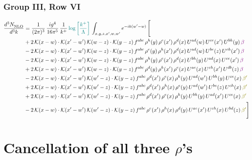 \documentclass[9pt]{article}
\numberwithin{equation}{section}
\begin{document}
\subsubsection{Group III, Row VI}
\begin{align}
     \frac{d^{3}N_{\rm NLO}^{\rm}}{d^{3}k}  & = \frac{1}{(2\pi)^{3}}\, \frac{ig^{4}}{16\pi^{5}}\, \frac{1}{k^{+}}\, {\color{teal}\log{\left[\frac{k^{+}}{\Lambda}\right]}}\,\int_{x,y,z,x^{\prime},w,w^{\prime}}e^{-ik(w^{\prime}-w)}\, \Bigg[\notag \\ & +2\,\mathcal{K}(x-w)\cdot\mathcal{K}(x'-w')\,\mathcal{K}(w-z)\cdot\mathcal{K}(y-z)\, f^{abc}\,\rho^{h}(y)\,\rho^{e}(x')\,\rho^{d}(x)\,U^{ad}(w)\,U^{ce}(x')\,U^{bh}(y)\,{\color{violet} \beta}\notag\\ &-2\,\mathcal{K}(x-w)\cdot\mathcal{K}(x'-w')\,\mathcal{K}(w-z)\cdot\mathcal{K}(y-z)\, f^{abc}\,\rho^{e}(y)\,\rho^{h}(x')\,\rho^{d}(x)\,U^{ad}(w)\,U^{be}(z)\,U^{ch}(x')\,{\color{violet} \beta}\notag \\ &-2\,\mathcal{K}(x-w)\cdot\mathcal{K}(x'-w')\,\mathcal{K}(w-z)\cdot\mathcal{K}(y-z)\, f^{abc}\,\rho^{h}(y)\,\rho^{e}(x')\,\rho^{d}(x)\,U^{bh}(y)\,U^{ad}(x)\,U^{ce}(x')\,{\color{violet} \beta}\notag\\ & +2\,\mathcal{K}(x-w)\cdot\mathcal{K}(x'-w')\,\mathcal{K}(w-z)\cdot\mathcal{K}(y-z)\, f^{abc}\,\rho^{d}(y)\,\rho^{h}(x')\,\rho^{e}(x)\,U^{ae}(x)\,U^{ch}(x')\,U^{db}(z)\,{\color{violet} \beta}\notag\\ & -2\, \mathcal{K}(x-w) \cdot \mathcal{K}(x'-w')\, \mathcal{K}(w'-z) \cdot \mathcal{K}(y-z)\, f^{abc}\, \rho^{d}(x')\,\rho^{e}(x)\, \rho^{h}(y)\,U^{ad}(w')\,U^{bh}(y)\,U^{ce}(x)\, {\color{olive} \beta'}\notag \\ & + 2\, \mathcal{K}(x-w) \cdot \mathcal{K}(x'-w')\, \mathcal{K}(w'-z) \cdot \mathcal{K}(y-z)\, f^{abc}\, \rho^{d}(x')\,\rho^{h}(x)\, \rho^{e}(y)\,U^{ad}(w')\,U^{be}(z)\,U^{ch}(x)\, {\color{olive} \beta'}\notag \\ & +2\, \mathcal{K}(x-w) \cdot \mathcal{K}(x'-w')\, \mathcal{K}(w'-z) \cdot \mathcal{K}(y-z)\, f^{abc}\, \rho^{d}(x')\,\rho^{e}(x)\, \rho^{h}(y)\,U^{bh}(y)\,U^{ad}(x')\,U^{ce}(x)\, {\color{olive} \beta'}\notag \\ & -2\, \mathcal{K}(x-w) \cdot \mathcal{K}(x'-w')\, \mathcal{K}(w'-z) \cdot \mathcal{K}(y-z)\, f^{abc}\, \rho^{e}(x')\,\rho^{h}(x)\, \rho^{d}(y)\,U^{ae}(x')\,U^{ch}(x)\,U^{bd}(z)\, {\color{olive} \beta'}\Bigg]
\end{align}  
\section{Cancellation of all three $\rho$'s}
\end{document}
